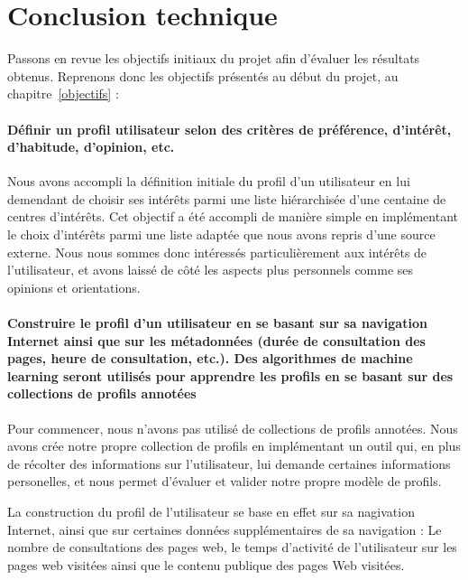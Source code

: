 

\section{Conclusion technique}

	Passons en revue les objectifs initiaux du projet afin d'évaluer les résultats obtenus. Reprenons donc les objectifs présentés au début du projet, au chapitre~\ref{objectifs} :

	\paragraph{Définir un profil utilisateur selon des critères de préférence, d’intérêt, d’habitude, d’opinion, etc.}

		Nous avons accompli la définition initiale du profil d'un utilisateur en lui demendant de choisir ses intérêts parmi une liste hiérarchisée d'une centaine de centres d'intérêts. Cet objectif a été accompli de manière simple en implémentant le choix d'intérêts parmi une liste adaptée que nous avons repris d'une source externe. Nous nous sommes donc intéressés particulièrement aux intérêts de l'utilisateur, et avons laissé de côté les aspects plus personnels comme ses opinions et orientations.

	\paragraph{Construire le profil d'un utilisateur en se basant sur sa navigation Internet ainsi que sur les métadonnées (durée de consultation des pages, heure de consultation, etc.). Des algorithmes de machine learning seront utilisés pour apprendre les profils en se basant sur des collections de profils annotées}

		Pour commencer, nous n'avons pas utilisé de collections de profils annotées. Nous avons crée notre propre collection de profils en implémentant un outil qui, en plus de récolter des informations sur l'utilisateur, lui demande certaines informations personelles, et nous permet d'évaluer et valider notre propre modèle de profils.

		La construction du profil de l'utilisateur se base en effet sur sa nagivation Internet, ainsi que sur certaines données supplémentaires de sa navigation : Le nombre de consultations des pages web, le temps d'activité de l'utilisateur sur les pages web visitées ainsi que le contenu publique des pages Web visitées.

